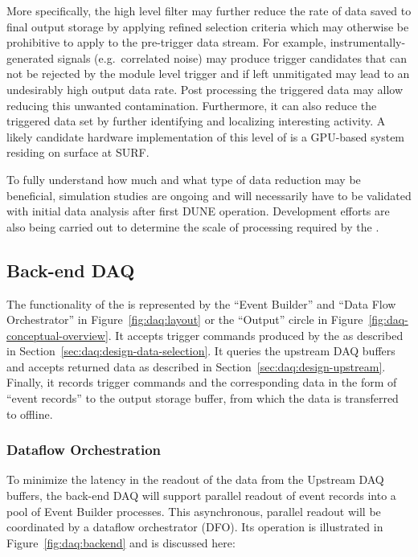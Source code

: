 More specifically, the high level filter may further reduce the rate of data
saved to final output storage by applying refined selection criteria which may
otherwise be prohibitive to apply to the pre-trigger data stream.
For example, instrumentally-generated signals (e.g.~correlated noise) may
produce trigger candidates that can not be rejected by the module level trigger
and if left unmitigated may lead to an undesirably high output data rate. 
Post processing the triggered data may allow reducing this unwanted
contamination.
Furthermore, it can also reduce the triggered data set by further identifying
and localizing interesting activity.
A likely candidate hardware implementation of this level of  is a
GPU-based system residing on surface at SURF.

To fully understand how much and what type of data reduction may be beneficial,
simulation studies are ongoing  and will necessarily have to be
validated with initial data analysis after first DUNE  operation.
Development efforts are also being carried out to determine the scale of
processing required by the .


\subsection{Back-end DAQ}
\label{sec:daq:design-backend}

The functionality of the  is represented by the ``Event Builder''
and ``Data Flow Orchestrator'' in Figure~\ref{fig:daq:layout} or the ``Output''
circle in Figure~\ref{fig:daq-conceptual-overview}. 
It accepts trigger commands produced by the  as described in
Section~\ref{sec:daq:design-data-selection}. 
It queries the upstream DAQ buffers and accepts returned data as described in
Section~\ref{sec:daq:design-upstream}. 
Finally, it records trigger commands and the corresponding data in the form of
``event records'' to the output storage buffer, from which the data is
transferred to offline.

\subsubsection{Dataflow Orchestration}

To minimize the latency in the readout of the data from the Upstream DAQ
buffers, the back-end DAQ will support parallel readout of event records into a
pool of Event Builder processes. 
This asynchronous, parallel readout will be coordinated by a dataflow
orchestrator (DFO). 
Its operation is illustrated in Figure~\ref{fig:daq:backend} and is discussed
here:

